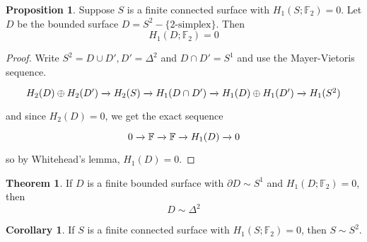 \documentclass[a4paper,14pt]{extarticle}
\theoremstyle{definition}
\newtheorem*{theorem}{Theorem}
\newtheorem*{corollary}{Corollary}
\newtheorem*{proposition}{Proposition}
\begin{document}
\begin{proposition}
	Suppose $S$ is a finite connected surface with $H_1(S;\mathbb{F}_2)=0$. Let $D$ be the
	bounded surface $D=S^2-\{\text{2-simplex}\}$. Then \[H_1(D;\mathbb{F}_2)=0\]
\end{proposition}

\begin{proof}
	Write $S^2=D\cup D', D'=\Delta^2$ and $D\cap D'=S^1$ and use the Mayer-Vietoris sequence.
	\[\begin{tikzcd}
		H_2(D)\oplus H_2(D')\xrightarrow{}H_2(S)\xrightarrow{}H_1(D\cap D')\xrightarrow{}
		H_1(D)\oplus H_1(D')\xrightarrow{} H_1(S^2)
	\end{tikzcd}\]
	and since $H_2(D)=0$, we get the exact sequence
	\[\begin{tikzcd}
		0\xrightarrow{}\mathbb{F}\xrightarrow{}\mathbb{F}\xrightarrow{}H_1(D)\xrightarrow{}0	
	\end{tikzcd}
	\] so by Whitehead's lemma, $H_1(D)=0$.
\end{proof}

\begin{theorem}
	If $D$ is a finite bounded surface with $\partial D\sim S^1$ and $H_1(D;\mathbb{F}_2)=0$,
	then \[D\sim\Delta^2\]
\end{theorem}

\begin{corollary}
	If $S$ is a finite connected surface with $H_1(S;\mathbb{F}_2)=0$, then $S\sim S^2$.
\end{corollary}
\end{document}

